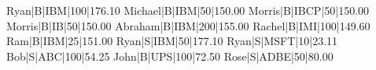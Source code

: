 Ryan|B|IBM|100|176.10
Michael|B|IBM|50|150.00
Morris|B|IBCP|50|150.00
Morris|B|IB|50|150.00
Abraham|B|IBM|200|155.00
Rachel|B|IMI|100|149.60 
Ram|B|IBM|25|151.00
Ryan|S|IBM|50|177.10
Ryan|S|MSFT|10|23.11
Bob|S|ABC|100|54.25
John|B|UPS|100|72.50
Rose|S|ADBE|50|80.00
